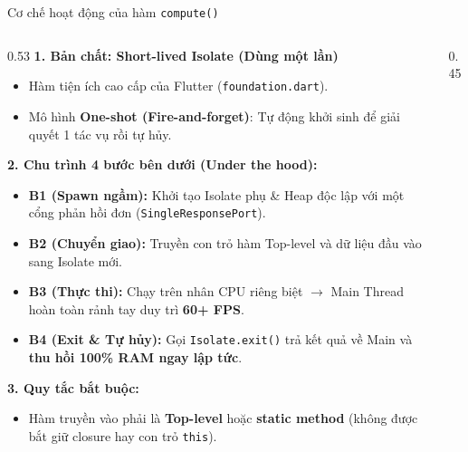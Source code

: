 \documentclass[aspectratio=169, 10pt]{beamer}
\begin{document}
\begin{frame}{Cơ chế hoạt động của hàm \texttt{compute()}}
  \vspace{-0.15cm}
  \begin{columns}[c]
    \begin{column}{0.53\textwidth}
      \footnotesize
      \textbf{1. Bản chất: Short-lived Isolate (Dùng một lần)}
      \begin{itemize}
        \setlength{\itemsep}{1pt}
        \item Hàm tiện ích cao cấp của Flutter (\texttt{foundation.dart}).
        \item Mô hình \textbf{One-shot (Fire-and-forget)}: Tự động khởi sinh để giải quyết 1 tác vụ rồi tự hủy.
      \end{itemize}
      \vspace{0.1cm}
      \textbf{2. Chu trình 4 bước bên dưới (Under the hood):}
      \begin{itemize}
        \setlength{\itemsep}{1.5pt}
        \item \textbf{B1 (Spawn ngầm):} Khởi tạo Isolate phụ \& Heap độc lập với một cổng phản hồi đơn (\texttt{SingleResponsePort}).
        \item \textbf{B2 (Chuyển giao):} Truyền con trỏ hàm Top-level và dữ liệu đầu vào sang Isolate mới.
        \item \textbf{B3 (Thực thi):} Chạy trên nhân CPU riêng biệt $\rightarrow$ Main Thread hoàn toàn rảnh tay duy trì \textbf{60+ FPS}.
        \item \textbf{B4 (Exit \& Tự hủy):} Gọi \texttt{Isolate.exit()} trả kết quả về Main và \textbf{thu hồi 100\% RAM ngay lập tức}.
      \end{itemize}
      \vspace{0.1cm}
      \textbf{3. Quy tắc bắt buộc:}
      \begin{itemize}
        \setlength{\itemsep}{1pt}
        \item Hàm truyền vào phải là \textbf{Top-level} hoặc \textbf{static method} (không được bắt giữ closure hay con trỏ \texttt{this}).
      \end{itemize}
    \end{column}

    \begin{column}{0.45\textwidth}
      \centering
\end{column}
\end{columns}
\end{frame}
\end{document}
